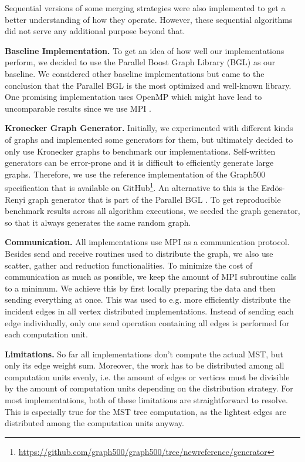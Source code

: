 \documentclass[letterpaper]{article}
\newcommand{\mypar}[1]{{\bf #1.}}
\begin{document}
Sequential versions of some merging strategies were also implemented to get a better understanding of how they operate.
However, these sequential algorithms did not serve any additional purpose beyond that.

\mypar{Baseline Implementation}
To get an idea of how well our implementations perform, we decided to use the Parallel Boost Graph Library (BGL)
\cite{bgl} as our baseline. We considered other baseline implementations but came to the conclusion that the Parallel
BGL is the most optimized and well-known library. One promising implementation uses OpenMP which might have lead to
uncomparable results since we use MPI \cite{15418}. %

\mypar{Kronecker Graph Generator}
\label{par:kronecker_graph_generator}
Initially, we experimented with different kinds of graphs and implemented some generators for them, but ultimately
decided to only use Kronecker graphs to benchmark our implementations. Self-written generators can be error-prone and it
is difficult to efficiently generate large graphs. Therefore, we use the reference implementation of the Graph500
specification that is available on
GitHub\footnote{\url{https://github.com/graph500/graph500/tree/newreference/generator}}. An alternative to this is the
Erdös-Renyi graph generator that is part of the Parallel BGL \cite{bgl}. To get reproducible benchmark results across
all algorithm executions, we seeded the graph generator, so that it always generates the same random graph.

\mypar{Communication}
All implementations use MPI as a communication protocol. Besides send and receive routines used to distribute the graph,
we also use scatter, gather and reduction functionalities. %
To minimize the cost of communication as much as possible, we keep the amount of MPI subroutine calls to a minimum. We
achieve this by first locally preparing the data and then sending everything at once. This was used to e.g. more
efficiently distribute the incident edges in all vertex distributed implementations. Instead of sending each edge
individually, only one send operation containing all edges is performed for each computation unit.

\mypar{Limitations}
\label{par:limitation}
So far all implementations don't compute the actual MST, but only its edge weight sum. Moreover, the work has to be
distributed among all computation units evenly, i.e. the amount of edges or vertices must be divisible by the amount of
computation units depending on the distribution strategy. For most implementations, both of these limitations are
straightforward to resolve. This is especially true for the MST tree computation, as the lightest edges are distributed
among the computation units anyway.
\end{document}
